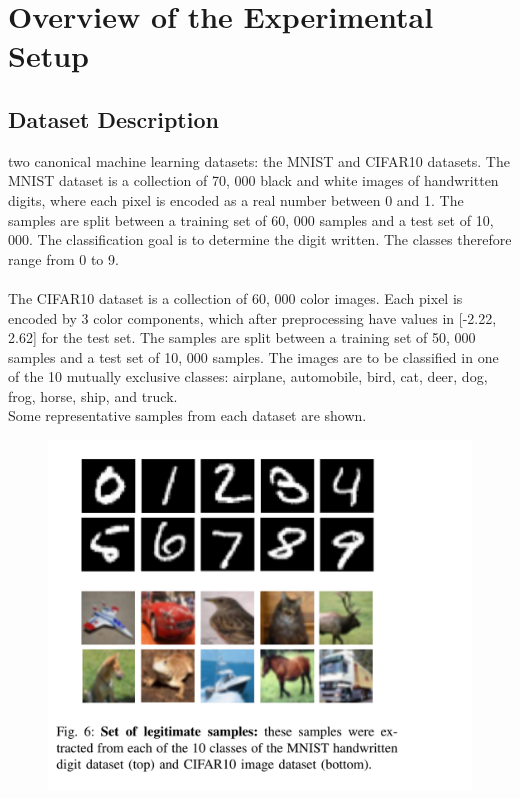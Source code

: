 \documentclass[12pt]{article}
\begin{document}
\section*{Overview of the Experimental Setup}
\subsection*{Dataset Description\cite{paper}}
two canonical machine learning datasets: the MNIST and CIFAR10 datasets.
The MNIST dataset is a collection of 70, 000 black and white images of handwritten digits, where each pixel is encoded as a real number between 0 and 1. The samples are split between a training set of 60, 000 samples and a test set of 10, 000. The classification goal is to determine the digit written. The classes therefore range from 0 to 9.\\\\
The CIFAR10 dataset is a collection of 60, 000 color images. Each pixel is encoded by 3 color components, which after preprocessing have values in
[-2.22, 2.62] for the test set. The samples are split between a training set of 50, 000 samples and a test set of 10, 000 samples. The images are to be classified in one of the 10 mutually exclusive classes: airplane, automobile, bird, cat, deer, dog, frog, horse, ship, and truck.\\
Some representative samples from each dataset are shown.
\begin{figure}[H]
\begin{center}
\includegraphics[scale=.5]{data}
\end{center}
\end{figure} 
\end{document}
